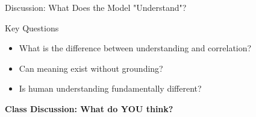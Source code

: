 \documentclass[aspectratio=169]{beamer}
\begin{document}
\begin{frame}[shrink=10]{Discussion: What Does the Model "Understand"? 🤔}
\begin{block}{Key Questions}
\begin{itemize}\setlength{\itemsep}{0pt}
    \item What is the difference between understanding and correlation?
    \item Can meaning exist without grounding?
    \item Is human understanding fundamentally different?
\end{itemize}
\end{block}

\textbf{Class Discussion: What do YOU think?}
\end{frame}

\end{document}
